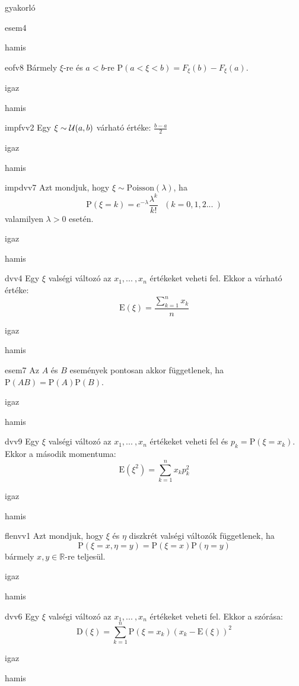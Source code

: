 \documentclass[12pt]{article}
\begin{document}
\begin{quiz}{gyakorló}
\begin{multi}[feedback={de-Morgan azonosság}]{esem4}
\item hamis
\end{multi}
\begin{multi}[feedback={Diszkrét v.v.-ra ez nem feltétlen igaz, ha $a$-t pozitív valséggel felveszi.}]{eofv8}
Bármely $\xi$-re és $a<b$-re $\mathrm{P}(a< \xi <b)=F_{\xi}(b)-F_{\xi}(a)$.
\item igaz
\item* hamis
\end{multi}
\begin{multi}[feedback={wiki}]{impfvv2}
Egy $\xi\sim {\cal U}(a,b)$ várható értéke: $\frac{b-a}{2}$
\item igaz
\item* hamis
\end{multi}
\begin{multi}[feedback={Def.}]{impdvv7}
Azt mondjuk, hogy $\xi\sim \mathrm{Poisson}(\lambda)$, ha 
$$
\mathrm{P}(\xi=k)=e^{-\lambda}\frac{\lambda^k}{k!}\ \ \ (k=0,1,2{...\:} )
$$ 
valamilyen $\lambda>0$ esetén.
\item* igaz
\item hamis
\end{multi}
\begin{multi}[feedback={Ez csak egyenletesre igaz.}]{dvv4}
Egy $\xi$ valségi változó az $x_1,{...\:}, x_n$ értékeket veheti fel. Ekkor a várható értéke:
$$
\mathrm{E}(\xi)=\frac{\sum_{k=1}^n x_k}{n}
$$
\item igaz
\item* hamis
\end{multi}
\begin{multi}[feedback={Definíció.}]{esem7}
Az $A$ és $B$ események pontosan akkor függetlenek, ha $\mathrm{P}(AB)=\mathrm{P}(A)\mathrm{P}(B)$.
\item* igaz
\item hamis
\end{multi}
\begin{multi}[feedback={Def.}]{dvv9}
Egy $\xi$ valségi változó az $x_1,{...\:}, x_n$ értékeket veheti fel és $p_k=\mathrm{P}(\xi=x_k)$. 
Ekkor a második momentuma:
$$
\mathrm{E}(\xi^2)=\sum_{k=1}^n x_k p_k^2
$$
\item igaz
\item* hamis
\end{multi}
\begin{multi}[feedback={Def.}]{flenvv1}
Azt mondjuk, hogy $\xi$ és $\eta$ diszkrét valségi változók függetlenek, ha
$$
\mathrm{P}(\xi=x,\eta=y)=\mathrm{P}(\xi=x)\mathrm{P}(\eta=y)
$$
bármely $x,y\in \mathbb{R}$-re teljesül.
\item* igaz
\item hamis
\end{multi}
\begin{multi}[feedback={Def.}]{dvv6}
Egy $\xi$ valségi változó az $x_1,{...\:}, x_n$ értékeket veheti fel. Ekkor a szórása:
$$
\mathrm{D}(\xi)=\sum_{k=1}^n \mathrm{P}(\xi=x_k)(x_k-\mathrm{E}(\xi))^2
$$
\item igaz
\item* hamis
\end{multi}
\end{quiz}
\end{document}
